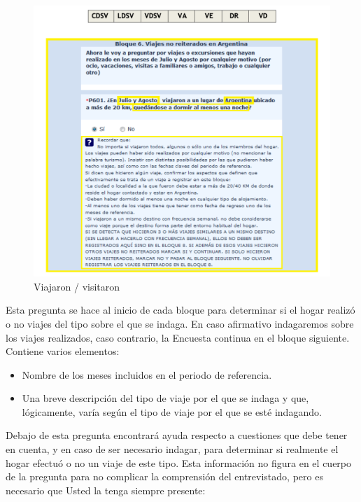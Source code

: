 \documentclass[
  openany]{book}
\begin{document}
\begin{figure}

{\centering \includegraphics[width=1\linewidth]{imagenes/figura6-73} 

}

\caption{Viajaron / visitaron}\label{fig:motivo}
\end{figure}

Esta pregunta se hace al inicio de cada bloque para determinar si el hogar realizó o no viajes del tipo sobre el que se indaga. En caso afirmativo indagaremos sobre los viajes realizados, caso contrario, la Encuesta continua en el bloque siguiente. Contiene varios elementos:

\begin{itemize}
\item
  Nombre de los meses incluidos en el periodo de referencia.
\item
  Una breve descripción del tipo de viaje por el que se indaga y que, lógicamente, varía según el tipo de viaje por el que se esté indagando.
\end{itemize}

Debajo de esta pregunta encontrará ayuda respecto a cuestiones que debe tener en cuenta, y en caso de ser necesario indagar, para determinar si realmente el hogar efectuó o no un viaje de este tipo. Esta información no figura en el cuerpo de la pregunta para no complicar la comprensión del entrevistado, pero es necesario que Usted la tenga siempre presente:
\end{document}
